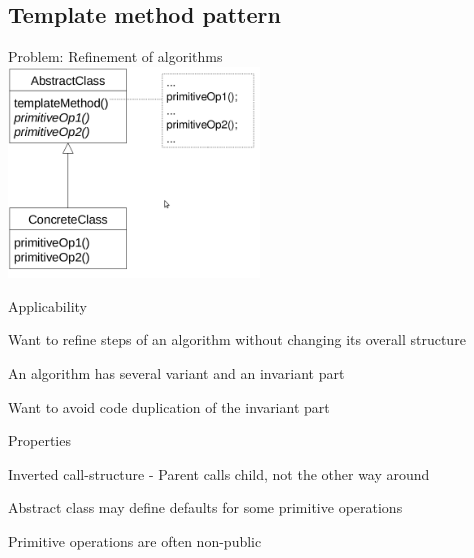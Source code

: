 \subsection{Template method pattern}
\enumstart
	\item Problem: Refinement of algorithms
	\\ \includegraphics[width=0.5\textwidth]{img/template_method_pattern.png}
	\item Applicability
	\enumstart
		\item Want to refine steps of an algorithm without changing its overall structure
		\item An algorithm has several variant and an invariant part
		\item Want to avoid code duplication of the invariant part
	\enumend
	\item Properties
	\enumstart
		\item Inverted call-structure - Parent calls child, not the other way around
		\item Abstract class may define defaults for some primitive operations
		\item Primitive operations are often non-public
	\enumend
\enumend

